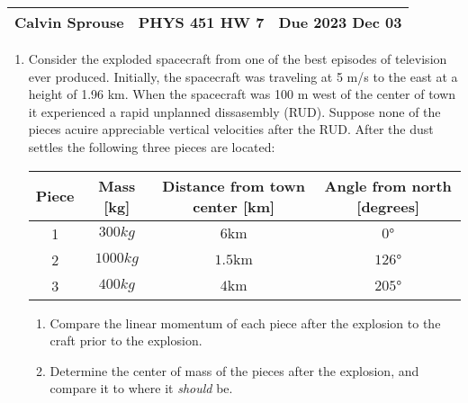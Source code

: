 \documentclass[a4paper, 12pt]{config/homework}
\begin{document}
\noindent
\begin{tabularx}{\textwidth}{>{\centering\arraybackslash}X>{\centering\arraybackslash}X>{\centering\arraybackslash}X}
Calvin Sprouse & PHYS 451 HW 7 & Due 2023 Dec 03\\
\midrule
\end{tabularx}

\begin{enumerate}
\item Consider the exploded spacecraft from one of the best episodes of television ever produced. Initially, the spacecraft was traveling at 5 m/s to the east at a height of 1.96 km. When the spacecraft was 100 m west of the center of town it experienced a rapid unplanned dissasembly (RUD). Suppose none of the pieces acuire appreciable vertical velocities after the RUD. After the dust settles the following three pieces are located:
\begin{table}[h]
    \centering
    \begin{tabular}{cccc}
    Piece & Mass [kg] & Distance from town center [km] & Angle from north [degrees] \\ \midrule
    1 & \(300 \unit{kg}\) & \(6 \unit{\kilo\meter}\) & \(0 \unit{\degree}\) \\
    2 & \(1000 \unit{kg}\) & \(1.5 \unit{\kilo\meter}\) & \(126 \unit{\degree}\) \\
    3 & \(400 \unit{kg}\) & \(4 \unit{\kilo\meter}\) & \(205 \unit{\degree}\)
    \end{tabular}
    \end{table}
\begin{enumerate}
\item Compare the linear momentum of each piece after the explosion to the craft prior to the explosion.
\item Determine the center of mass of the pieces after the explosion, and compare it to where it \textit{should} be.
\end{enumerate}

\end{enumerate}
\end{document}
